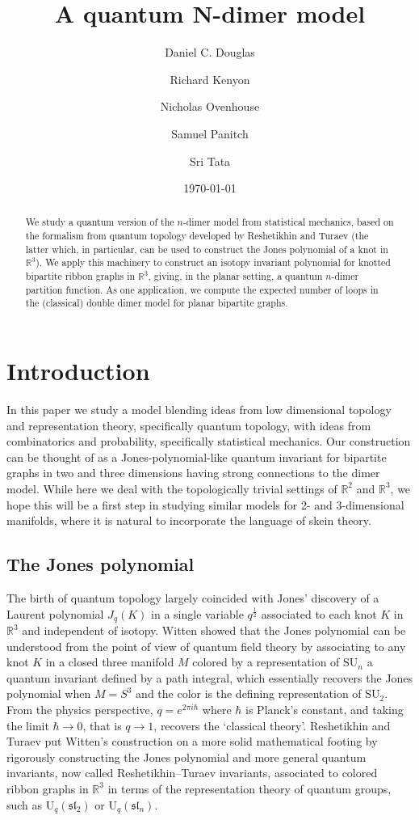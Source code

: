 \documentclass[12pt, reqno]{amsart}
\title{A quantum N-dimer model}
\author[D. C. Douglas]{Daniel C. Douglas}
\author[R. Kenyon]{Richard Kenyon}
\author[N. Ovenhouse]{Nicholas Ovenhouse}
\author[S. Panitch]{Samuel Panitch}
\author[S. Tata]{Sri Tata}
\date{\today}
\theoremstyle{definition}
\newcommand{\R}{\mathbb{R}}%
\begin{document}
\begin{abstract}
We study a quantum version of the $n$-dimer model from statistical mechanics, based on the formalism from quantum topology   developed by Reshetikhin and Turaev (the latter which, in particular, can be used to construct the Jones polynomial of a knot in $\mathbb{R}^3$).  We apply this machinery to construct an isotopy invariant polynomial for knotted bipartite   ribbon graphs in $\mathbb{R}^3$, giving, in the planar setting, a quantum \hbox{$n$-dimer} partition function.    As one application, we compute the expected number of loops in the (classical) double dimer model for planar bipartite graphs.
\end{abstract}

\maketitle

\section{Introduction}\label{sec:intro}

In this paper we study a model blending ideas from low dimensional topology and representation theory, specifically quantum topology,   with ideas from combinatorics and probability, specifically statistical mechanics.  Our construction can be thought of as   a Jones-polynomial-like quantum invariant for bipartite graphs in two and three dimensions having strong connections to the dimer model.    While here we deal with the topologically trivial settings of $\R^2$ and $\R^3$, we hope this will be a first step in studying similar   models for 2- and 3-dimensional manifolds, where it is natural to incorporate the language of skein theory.  

\subsection{The Jones polynomial}

The birth of quantum topology largely coincided with Jones' discovery \cite{Jones} of a Laurent polynomial $J_q(K)$ in a single variable $q^\frac{1}2$ associated to each knot $K$ in $\R^3$ and independent of isotopy.  Witten \cite{Witten} showed that the Jones polynomial can be understood from the point of view of quantum field theory by associating to any knot $K$ in a closed three manifold $M$ colored by a representation of $\mathrm{SU}_n$ a quantum invariant defined by a path integral, which essentially recovers the Jones polynomial when $M=S^3$ and the color is the defining representation of $\mathrm{SU}_2$.  From the physics perspective, $q=e^{2\pi i\hbar}$ where $\hbar$ is Planck's constant, and taking the limit $\hbar\to0$, that is $q\to1$, recovers the `classical theory'.  Reshetikhin and Turaev \cite{reshetikhin1} put Witten's construction on a more solid mathematical footing by rigorously constructing the Jones polynomial and more general quantum invariants, now called Reshetikhin--Turaev invariants, associated to colored ribbon graphs in $\R^3$ in terms of the representation theory of quantum groups, such as $\mathrm{U}_q(\mathfrak{sl}_2)$ or $\mathrm{U}_q(\mathfrak{sl}_n)$.  
\end{document}
